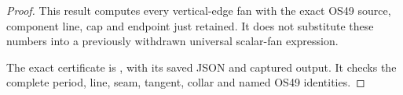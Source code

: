 \begin{proof}
This result computes every vertical-edge fan with the exact
OS49 source, component line, cap and endpoint just retained.
It does not substitute these numbers into a previously
withdrawn universal scalar-fan expression.

\par\medskip The exact certificate is , with its saved JSON and captured output. It checks the complete period, line, seam, tangent, collar and named OS49 identities.
\end{proof}
